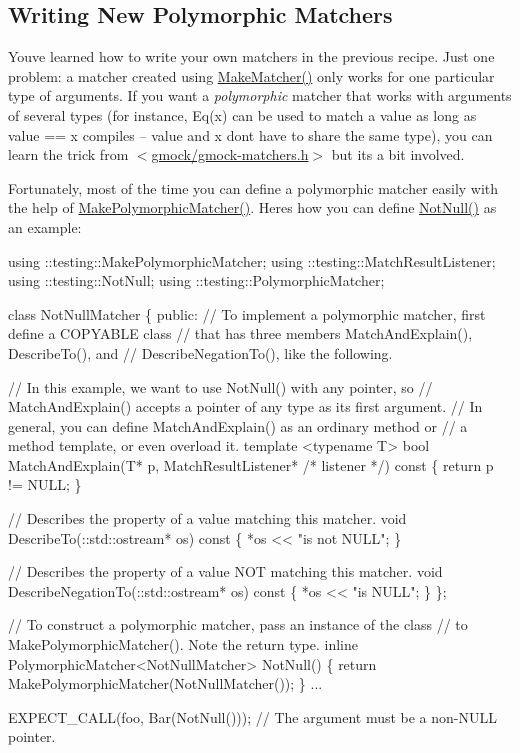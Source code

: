 \subsection*{Writing New Polymorphic Matchers}

You\textquotesingle{}ve learned how to write your own matchers in the previous recipe. Just one problem\+: a matcher created using {\ttfamily \hyperlink{namespacetesting_a37fd8029ac00e60952440a3d9cca8166}{Make\+Matcher()}} only works for one particular type of arguments. If you want a {\itshape polymorphic} matcher that works with arguments of several types (for instance, {\ttfamily Eq(x)} can be used to match a {\ttfamily value} as long as {\ttfamily value} == {\ttfamily x} compiles -- {\ttfamily value} and {\ttfamily x} don\textquotesingle{}t have to share the same type), you can learn the trick from {\ttfamily $<$\hyperlink{gmock-matchers_8h}{gmock/gmock-\/matchers.\+h}$>$} but it\textquotesingle{}s a bit involved.

Fortunately, most of the time you can define a polymorphic matcher easily with the help of {\ttfamily \hyperlink{namespacetesting_a667ca94f190ec2e17ee2fbfdb7d3da04}{Make\+Polymorphic\+Matcher()}}. Here\textquotesingle{}s how you can define {\ttfamily \hyperlink{namespacetesting_a39d1f92b53b8b2a0b6db6a22ac146416}{Not\+Null()}} as an example\+:


\begin{DoxyCode}
using ::testing::MakePolymorphicMatcher;
using ::testing::MatchResultListener;
using ::testing::NotNull;
using ::testing::PolymorphicMatcher;

class NotNullMatcher \{
 public:
  // To implement a polymorphic matcher, first define a COPYABLE class
  // that has three members MatchAndExplain(), DescribeTo(), and
  // DescribeNegationTo(), like the following.

  // In this example, we want to use NotNull() with any pointer, so
  // MatchAndExplain() accepts a pointer of any type as its first argument.
  // In general, you can define MatchAndExplain() as an ordinary method or
  // a method template, or even overload it.
  template <typename T>
  bool MatchAndExplain(T* p,
                       MatchResultListener* /* listener */) const \{
    return p != NULL;
  \}

  // Describes the property of a value matching this matcher.
  void DescribeTo(::std::ostream* os) const \{ *os << "is not NULL"; \}

  // Describes the property of a value NOT matching this matcher.
  void DescribeNegationTo(::std::ostream* os) const \{ *os << "is NULL"; \}
\};

// To construct a polymorphic matcher, pass an instance of the class
// to MakePolymorphicMatcher().  Note the return type.
inline PolymorphicMatcher<NotNullMatcher> NotNull() \{
  return MakePolymorphicMatcher(NotNullMatcher());
\}
...

  EXPECT\_CALL(foo, Bar(NotNull()));  // The argument must be a non-NULL pointer.
\end{DoxyCode}


